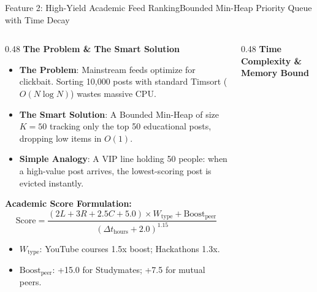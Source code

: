 \documentclass[aspectratio=169,10pt]{beamer}
\begin{document}
\begin{frame}[fragile,t]{Feature 2: High-Yield Academic Feed Ranking}{Bounded Min-Heap Priority Queue with Time Decay}
  \begin{columns}[t]
    \begin{column}{0.48\textwidth}
      {\fontsize{9.0}{11.0}\selectfont\textbf{\textcolor{KoinexaRed}{The Problem \& The Smart Solution}}}\par\vspace{1.5pt}
      \begin{itemize}\setlength{\itemsep}{1.2pt}
        \item {\fontsize{8.0}{9.8}\selectfont \textbf{The Problem}: Mainstream feeds optimize for clickbait. Sorting 10,000 posts with standard Timsort ($O(N \log N)$) wastes massive CPU.}
        \item {\fontsize{8.0}{9.8}\selectfont \textbf{The Smart Solution}: A Bounded Min-Heap of size $K=50$ tracking only the top 50 educational posts, dropping low items in $O(1)$.}
        \item {\fontsize{8.0}{9.8}\selectfont \textbf{Simple Analogy}: A VIP line holding 50 people: when a high-value post arrives, the lowest-scoring post is evicted instantly.}
      \end{itemize}
      \vspace{0.1cm}
      {\fontsize{8.0}{10.0}\selectfont\textbf{\textcolor{KoinexaOrange}{Academic Score Formulation:}}}
      {\footnotesize
      $$\text{Score} = \frac{(2L + 3R + 2.5C + 5.0) \times W_{\text{type}} + \text{Boost}_{\text{peer}}}{(\Delta t_{\text{hours}} + 2.0)^{1.15}}$$
      }
      \vspace{-0.2cm}
      \begin{itemize}\setlength{\itemsep}{0.8pt}
        \item {\fontsize{7.5}{9.2}\selectfont $W_{\text{type}}$: YouTube courses 1.5x boost; Hackathons 1.3x.}
        \item {\fontsize{7.5}{9.2}\selectfont $\text{Boost}_{\text{peer}}$: +15.0 for Studymates; +7.5 for mutual peers.}
      \end{itemize}
    \end{column}
    \begin{column}{0.48\textwidth}
      {\fontsize{9.0}{11.0}\selectfont\textbf{\textcolor{KoinexaOrange}{Time Complexity \& Memory Bound}}}\par\vspace{1.5pt}

\end{column}
\end{columns}
\end{frame}
\end{document}
